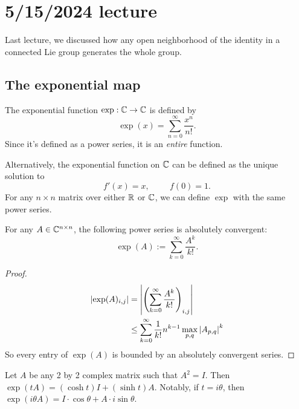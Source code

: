 \documentclass[class=article, crop=false]{standalone}
\begin{document}
\section{5/15/2024 lecture}
Last lecture, we discussed how any open neighborhood of the identity in a connected Lie group generates the whole group.

\subsection{The exponential map}
The exponential function $\exp: \mathbb{C} \rightarrow \mathbb{C}$ is defined by
\[ \exp(x) = \sum_{n=0}^\infty \frac{x^n}{n!}. \]
Since it's defined as a power series, it is an \textit{entire} function.
\par
Alternatively, the exponential function on $\mathbb{C}$ can be defined as the unique solution to
\[ f'(x)=x, \hspace{1cm} f(0)=1. \]
For any $n \times n$ matrix over either $\mathbb{R}$ or $\mathbb{C}$, we can define $\exp$ with the same power series.
\begin{prop}
    For any $A \in \mathbb{C}^{n \times n}$, the following power series is absolutely convergent:
    \[ \exp(A) := \sum_{k=0}^\infty \frac{A^k}{k!}. \]
\end{prop}
\begin{proof}
    \begin{align*}
        \left\lvert \exp(A)_{i,j} \right\rvert &= \left\lvert \left( \sum_{k=0}^\infty \frac{A^k}{k!} \right)_{i,j} \right\rvert \\
                            &\leq \sum_{k=0}^\infty \frac{1}{k!} n^{k-1} \max_{p,q} \left\lvert A_{p,q} \right\rvert^k
    \end{align*}
    So every entry of $\exp(A)$ is bounded by an absolutely convergent series.
\end{proof}
\begin{example}
    Let $A$ be any 2 by 2 complex matrix such that $A^2=I$. Then $\exp(tA)= \left( \cosh t \right) I + \left( \sinh t \right) A$. Notably, if $t=i \theta$, then $\exp(i \theta A) = I \cdot \cos \theta + A \cdot i \sin \theta$.
\end{example}
\end{document}
